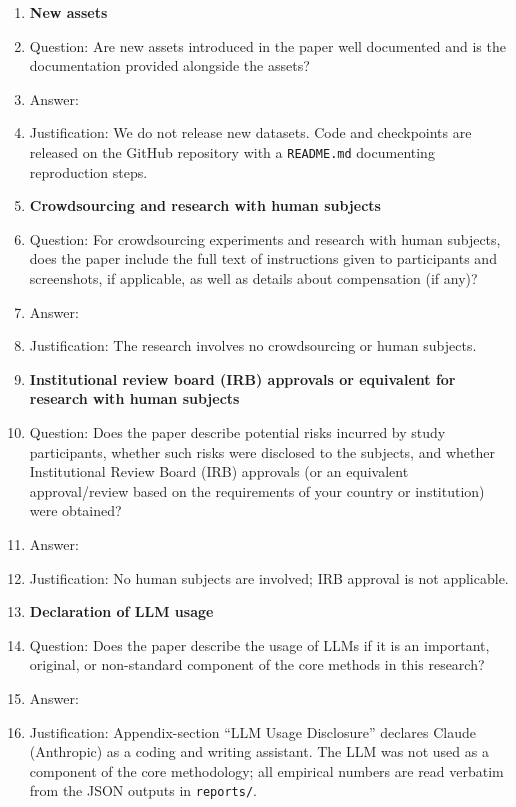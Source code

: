 \documentclass{article}
\begin{document}
\begin{enumerate}
\item {\bf New assets}
    \item[] Question: Are new assets introduced in the paper well documented and is the documentation provided alongside the assets?
    \item[] Answer: \answerNA{}
    \item[] Justification: We do not release new datasets. Code and checkpoints are released on the GitHub repository with a \texttt{README.md} documenting reproduction steps.

\item {\bf Crowdsourcing and research with human subjects}
    \item[] Question: For crowdsourcing experiments and research with human subjects, does the paper include the full text of instructions given to participants and screenshots, if applicable, as well as details about compensation (if any)?
    \item[] Answer: \answerNA{}
    \item[] Justification: The research involves no crowdsourcing or human subjects.

\item {\bf Institutional review board (IRB) approvals or equivalent for research with human subjects}
    \item[] Question: Does the paper describe potential risks incurred by study participants, whether such risks were disclosed to the subjects, and whether Institutional Review Board (IRB) approvals (or an equivalent approval/review based on the requirements of your country or institution) were obtained?
    \item[] Answer: \answerNA{}
    \item[] Justification: No human subjects are involved; IRB approval is not applicable.

\item {\bf Declaration of LLM usage}
    \item[] Question: Does the paper describe the usage of LLMs if it is an important, original, or non-standard component of the core methods in this research?
    \item[] Answer: \answerYes{}
    \item[] Justification: Appendix-section ``LLM Usage Disclosure'' declares Claude (Anthropic) as a coding and writing assistant. The LLM was not used as a component of the core methodology; all empirical numbers are read verbatim from the JSON outputs in \texttt{reports/}.

\end{enumerate}
\end{document}
